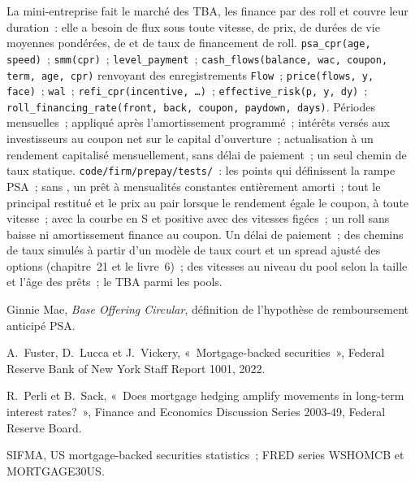 \begin{build}
 La mini-entreprise fait le marché des TBA, les finance par des
roll et couvre leur duration~: elle a besoin de flux sous toute vitesse, de prix,
de durées de vie moyennes pondérées, de  et de taux de financement de roll.
 \texttt{psa\_cpr(age, speed)}~; \texttt{smm(cpr)}~;
\texttt{level\_payment}~; \texttt{cash\_flows(balance, wac, coupon, term, age,
cpr)} renvoyant des enregistrements \texttt{Flow}~; \texttt{price(flows, y, face)}~;
\texttt{wal}~; \texttt{refi\_cpr(incentive, \ldots)}~;
\texttt{effective\_risk(p, y, dy)}~; \texttt{roll\_financing\_rate(front, back,
coupon, paydown, days)}.  Périodes mensuelles~;  appliqué après l'amortissement programmé~;
intérêts versés aux investisseurs au coupon net sur le capital d'ouverture~; actualisation à un
rendement capitalisé mensuellement, sans délai de paiement~; un seul chemin de taux statique.
 \texttt{code/firm/prepay/tests/}~: les points qui définissent
la rampe PSA~; sans , un prêt à mensualités constantes entièrement amorti~;
tout le principal restitué et le prix au pair lorsque le rendement égale le coupon,
à toute vitesse~;  avec la courbe en S et positive avec des
vitesses figées~; un roll sans baisse ni amortissement finance au coupon.
 Un délai de paiement~; des chemins de taux simulés à partir d'un modèle de taux court
et un spread ajusté des options (chapitre~21 et le livre~6)~; des vitesses au niveau du pool
selon la taille et l'âge des prêts~; le TBA  parmi les pools.
\end{build}

\begin{omsources}
\item Ginnie Mae, \emph{Base Offering Circular}, définition de l'hypothèse de
remboursement anticipé PSA.
\item A.~Fuster, D.~Lucca et J.~Vickery, «~Mortgage-backed securities~»,
Federal Reserve Bank of New York Staff Report 1001, 2022.
\item R.~Perli et B.~Sack, «~Does mortgage hedging amplify movements in
long-term interest rates?~», Finance and Economics Discussion Series 2003-49,
Federal Reserve Board.
\item SIFMA, US mortgage-backed securities statistics~; FRED series WSHOMCB et
MORTGAGE30US.
\end{omsources}

